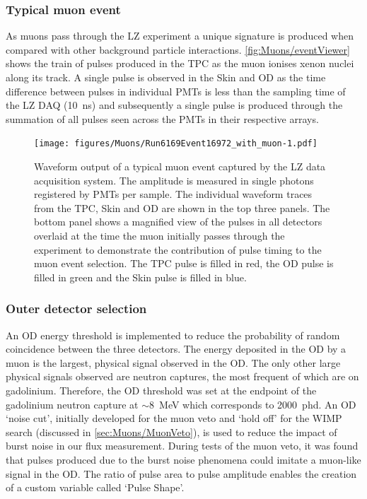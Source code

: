 \subsubsection{Typical muon event}
As muons pass through the LZ experiment a unique signature is produced when compared with other background particle interactions. \autoref{fig:Muons/eventViewer} shows the train of pulses produced in the TPC as the muon ionises xenon nuclei along its track. A single pulse is observed in the Skin and OD as the time difference between pulses in individual PMTs is less than the sampling time of the LZ DAQ (10~ns) and subsequently a single pulse is produced through the summation of all pulses seen across the PMTs in their respective arrays.
\begin{figure}[h!]
    \centering \texttt{[image: figures/Muons/Run6169Event16972\_with\_muon-1.pdf]}
    \caption[Waveform output of a typical muon event captured by the LZ data acquisition system.]{Waveform output of a typical muon event captured by the LZ data acquisition system. The amplitude is measured in single photons registered by PMTs per sample. The individual waveform traces from the TPC, Skin and OD are shown in the top three panels. The bottom panel shows a magnified view of the pulses in all detectors overlaid at the time the muon initially passes through the experiment to demonstrate the contribution of pulse timing to the muon event selection. The TPC pulse is filled in red, the OD pulse is filled in green and the Skin pulse is filled in blue.}
    \label{fig:Muons/eventViewer}
\end{figure}

\subsubsection{Outer detector selection}\label{sec:Muons/MuonFluxODSelection}
An OD energy threshold is implemented to reduce the probability of random coincidence between the three detectors. The energy deposited in the OD by a muon is the largest, physical signal observed in the OD. The only other large physical signals observed are neutron captures, the most frequent of which are on gadolinium. Therefore, the OD threshold was set at the endpoint of the gadolinium neutron capture at $\sim$8~MeV which corresponds to 2000~phd.
An OD `noise cut', initially developed for the muon veto and `hold off' for the WIMP search (discussed in \autoref{sec:Muons/MuonVeto}), is used to reduce the impact of burst noise in our flux measurement. During tests of the muon veto, it was found that pulses produced due to the burst noise phenomena could imitate a muon-like signal in the OD. The ratio of pulse area to pulse amplitude enables the creation of a custom variable called `Pulse Shape'.

